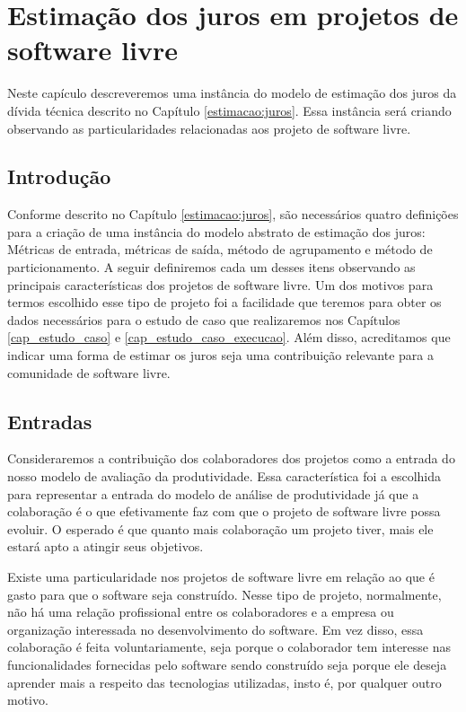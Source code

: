 \chapter{Estimação dos juros em projetos de software livre}

Neste capículo descreveremos uma instância do modelo de estimação dos juros da dívida técnica descrito no Capítulo \ref{estimacao:juros}. Essa instância será criando observando as particularidades relacionadas aos projeto de software livre.  

\section{Introdução}

Conforme descrito no Capítulo \ref{estimacao:juros}, são necessários quatro definições para a criação de uma instância do modelo abstrato de estimação dos juros: Métricas de entrada, métricas de saída, método de agrupamento e método de particionamento. A seguir definiremos cada um desses itens observando as principais características dos projetos de software livre. Um dos motivos para termos escolhido esse tipo de projeto foi a facilidade que teremos para obter os dados necessários para o estudo de caso que realizaremos nos Capítulos \ref{cap_estudo_caso} e \ref{cap_estudo_caso_execucao}. Além disso, acreditamos que indicar uma forma de estimar os juros seja uma contribuição relevante para a comunidade de software livre.

\section{Entradas}
\label{cap_metodo:modelos_de_entrada}

Consideraremos a contribuição dos colaboradores dos projetos como a entrada do nosso modelo de avaliação da produtividade. Essa característica foi a escolhida para representar a entrada do modelo de análise de produtividade já que a colaboração é o que efetivamente faz com que  o projeto de software livre possa evoluir. O esperado é que quanto mais colaboração um projeto tiver, mais ele estará apto a atingir seus objetivos. 

Existe uma particularidade nos projetos de software livre em relação ao que é gasto  para que o software seja construído. Nesse tipo de projeto, normalmente, não há uma relação profissional entre os colaboradores e a empresa ou organização interessada no desenvolvimento do software. Em vez disso, essa colaboração é feita voluntariamente, seja porque o colaborador tem interesse nas funcionalidades fornecidas pelo software sendo construído seja porque ele deseja aprender mais a respeito das tecnologias utilizadas, insto é, por qualquer outro motivo. 

